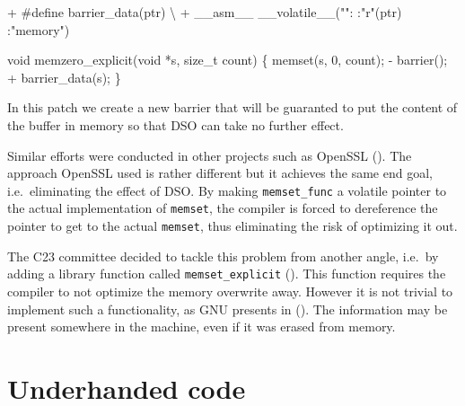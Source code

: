 \documentclass[
  a4paper,
]{report}
\newenvironment{Shaded}{}{}
\newcommand{\DataTypeTok}[1]{\textcolor[rgb]{0.56,0.13,0.00}{#1}}
\newcommand{\DecValTok}[1]{\textcolor[rgb]{0.25,0.63,0.44}{#1}}
\newcommand{\NormalTok}[1]{#1}
\newcommand{\OperatorTok}[1]{\textcolor[rgb]{0.40,0.40,0.40}{#1}}
\newcommand{\StringTok}[1]{\textcolor[rgb]{0.25,0.44,0.63}{#1}}
\begin{document}
\begin{Shaded}
\begin{Highlighting}[]
\OperatorTok{+}\NormalTok{ \#define barrier\_data}\OperatorTok{(}\NormalTok{ptr}\OperatorTok{)}\NormalTok{ \textbackslash{}}
\OperatorTok{+}\NormalTok{  \_\_asm\_\_ \_\_volatile\_\_}\OperatorTok{(}\StringTok{""}\OperatorTok{:} \OperatorTok{:}\StringTok{"r"}\OperatorTok{(}\NormalTok{ptr}\OperatorTok{)} \OperatorTok{:}\StringTok{"memory"}\OperatorTok{)}

\DataTypeTok{void}\NormalTok{ memzero\_explicit}\OperatorTok{(}\DataTypeTok{void} \OperatorTok{*}\NormalTok{s}\OperatorTok{,} \DataTypeTok{size\_t}\NormalTok{ count}\OperatorTok{)}
\OperatorTok{\{}
\NormalTok{  memset}\OperatorTok{(}\NormalTok{s}\OperatorTok{,} \DecValTok{0}\OperatorTok{,}\NormalTok{ count}\OperatorTok{);}
  \OperatorTok{{-}}\NormalTok{ barrier}\OperatorTok{();}
  \OperatorTok{+}\NormalTok{ barrier\_data}\OperatorTok{(}\NormalTok{s}\OperatorTok{);}
\OperatorTok{\}}
\end{Highlighting}
\end{Shaded}

In this patch we create a new barrier that will be guaranted to put the
content of the buffer in memory so that DSO can take no further effect.

Similar efforts were conducted in other projects such as OpenSSL
(). The approach OpenSSL used is
rather different but it achieves the same end goal, i.e.~eliminating the
effect of DSO. By making \texttt{memset\_func} a volatile pointer to the
actual implementation of \texttt{memset}, the compiler is forced to
dereference the pointer to get to the actual \texttt{memset}, thus
eliminating the risk of optimizing it out.

The C23 committee decided to tackle this problem from another angle,
i.e.~by adding a library function called \texttt{memset\_explicit}
(). This
function requires the compiler to not optimize the memory overwrite
away. However it is not trivial to implement such a functionality, as
GNU presents in (). The information may be present somewhere in the machine, even if
it was erased from memory.

\chapter{Underhanded code}\label{underhanded-code}
\end{document}
